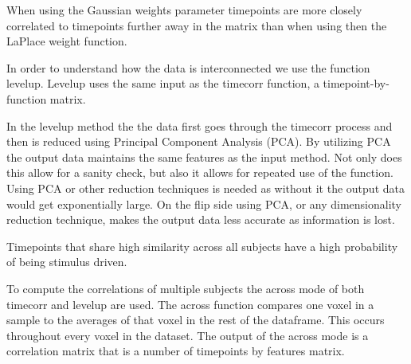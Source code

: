 
When using the Gaussian weights parameter timepoints are more closely correlated to timepoints further away in the matrix than when using then the LaPlace weight function.


In order to understand how the data is interconnected we use the function levelup. Levelup uses the same input as the timecorr function, a timepoint-by-function matrix. 


In the levelup method the the data first goes through the timecorr process and then is reduced using Principal Component Analysis (PCA). By utilizing PCA the output data maintains the same features as the input method. Not only does this allow for a sanity check, but also it allows for repeated use of the function. Using PCA or other reduction techniques is needed as without it the output data would get exponentially large. On the flip side using PCA, or any dimensionality reduction technique, makes the output data less accurate as information is lost. 




Timepoints that share high similarity across all subjects have a high probability of being stimulus driven.

To compute the correlations of multiple subjects the across mode of both timecorr and levelup are used. The across function compares one voxel in a sample to the averages of that voxel in the rest of the dataframe. This occurs throughout every voxel in the dataset. The output of the across mode is a correlation matrix that is a number of timepoints by features matrix.

